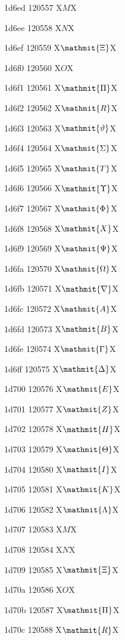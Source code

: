 \documentclass[11pt]{article}
\begin{document}
1d6ed 120557 X{\ensuremath{M}}X

1d6ee 120558 X{\ensuremath{N}}X

1d6ef 120559 X{\ensuremath{\mathmit{\Xi}}}X

1d6f0 120560 X{\ensuremath{O}}X

1d6f1 120561 X{\ensuremath{\mathmit{\Pi}}}X

1d6f2 120562 X{\ensuremath{\mathmit{R}}}X

1d6f3 120563 X{\ensuremath{\mathmit{\vartheta}}}X

1d6f4 120564 X{\ensuremath{\mathmit{\Sigma}}}X

1d6f5 120565 X{\ensuremath{\mathmit{T}}}X

1d6f6 120566 X{\ensuremath{\mathmit{\Upsilon}}}X

1d6f7 120567 X{\ensuremath{\mathmit{\Phi}}}X

1d6f8 120568 X{\ensuremath{\mathmit{X}}}X

1d6f9 120569 X{\ensuremath{\mathmit{\Psi}}}X

1d6fa 120570 X{\ensuremath{\mathmit{\Omega}}}X

1d6fb 120571 X{\ensuremath{\mathmit{\nabla}}}X

1d6fc 120572 X{\ensuremath{\mathmit{A}}}X

1d6fd 120573 X{\ensuremath{\mathmit{B}}}X

1d6fe 120574 X{\ensuremath{\mathmit{\Gamma}}}X

1d6ff 120575 X{\ensuremath{\mathmit{\Delta}}}X

1d700 120576 X{\ensuremath{\mathmit{E}}}X

1d701 120577 X{\ensuremath{\mathmit{Z}}}X

1d702 120578 X{\ensuremath{\mathmit{H}}}X

1d703 120579 X{\ensuremath{\mathmit{\Theta}}}X

1d704 120580 X{\ensuremath{\mathmit{I}}}X

1d705 120581 X{\ensuremath{\mathmit{K}}}X

1d706 120582 X{\ensuremath{\mathmit{\Lambda}}}X

1d707 120583 X{\ensuremath{M}}X

1d708 120584 X{\ensuremath{N}}X

1d709 120585 X{\ensuremath{\mathmit{\Xi}}}X

1d70a 120586 X{\ensuremath{O}}X

1d70b 120587 X{\ensuremath{\mathmit{\Pi}}}X

1d70c 120588 X{\ensuremath{\mathmit{R}}}X
\end{document}
